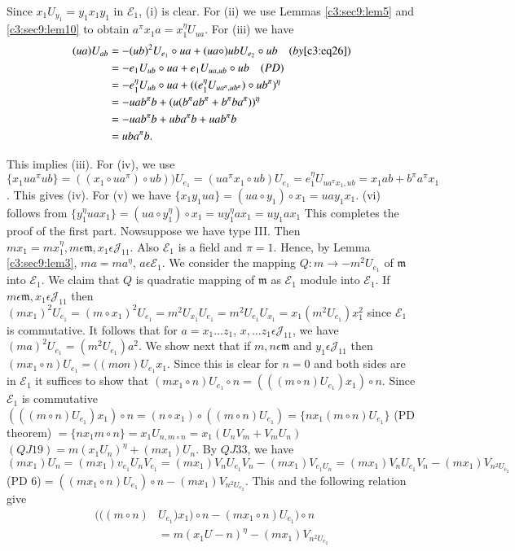 Since $x_1U_{y_1}=y_1x_1y_1$ in $\mathcal{E}_1$, (i) is clear. For
(ii) we use Lemmas \ref{c3:sec9:lem5} and \ref{c3:sec9:lem10} to obtain
$a^{\pi}x_1a=x^{\eta}_1U_{ua}$. For (iii) we have 
\begin{align*}
  (ua)U_{ab}&=-(ub)^{2}U_{e_1}\circ ua +(ua\circ)ubU_{e_2}\circ ub\quad
  (by \eqref{c3:eq26})\\
  &=-e_1U_{ub}\circ ua +e_1U_{ua,ub}\circ ub\quad (PD)\\
  &=-e_1^{\eta}U_{ub}\circ ua+((e^{\eta}_1U_{ua^{\pi},ub^{\pi}})\circ
  ub^{\pi})^{\eta}\\
  &=-uab^{\pi}b+(u(b^{\pi}ab^{\pi}+b^{\pi}ba^{\pi}))^{\eta}\\
  &=-uab^{\pi}b+ub a^{\pi} b+uab^{\pi}b\\
  &=uba^{\pi}b.
\end{align*}

This implies (iii). For (iv), we use $\{x_1ua^{\pi}ub\}=((x_1\circ
ua^{\pi})\circ ub))U_{e_1}=(ua^{\pi}x_1\circ
ub)U_{e_1}=e^{\eta}_1U_{ua^{\pi}x_{1},ub}=x_1 ab+b^{\pi} a^{\pi}
x_1$. This gives (iv). For (v) we have $\{x_1y_1ua\}=(ua \circ
y_1)\circ x_1=u ay_1x_1$. (vi) follows from $\{y^{\eta}_1ua
x_1\}=(ua\circ y^{\eta}_1)\circ x_1=uy^{\eta}_1a x_1=u y_1ax_1$ This
completes the proof of the first part. Now\pageoriginale suppose we
have type III. Then $mx_1=mx_1^{\eta}, m\epsilon \mathfrak{m},
x_1\epsilon \mathscr{J}_{11}$. Also  $\mathcal{E}_1$ is a field and
$\pi=1$. Hence, by Lemma \ref{c3:sec9:lem3}, $ma=ma^{\eta}$, $a\epsilon
\mathcal{E}_1$. We consider the mapping $Q:m\to -m^{2}U_{e_1}$ of
$\mathfrak{m}$ into $\mathcal{E}_1$. We claim that $Q$ is quadratic
mapping of $\mathfrak{m}$ as $\mathcal{E}_1$ module into
$\mathcal{E}_1$. If $m\epsilon \mathfrak{m}, x_1\epsilon
\mathscr{J}_{11}$ then $(mx_1)^{2}U_{e_1}=(m\circ
x_1)^{2}U_{e_1}=m^{2}U_{x_1}U_{e_1}=m^{2}U_{e_1}U_{x_1}=x_1(m^{2}U_{e_1})x^{2}_1$
since $\mathcal{E}_1$ is commutative. It follows that for $a=x_1\ldots
z_1$, $x,\ldots z_1\epsilon \mathscr{J}_{11}$, we have
$(ma)^{2}U_{e_1}=(m^{2}U_{e_1})a^{2}$. We show next that if
$m,n\epsilon\mathfrak{m}$ and $y_1\epsilon \mathscr{J}_{11}$ then
$(mx_1\circ n)U_{e_1}=((mon)U_{e_1}x_1$. Since this is clear for $n=0$
and both sides are in $\mathcal{E}_1$ it suffices to show that $(m
x_1\circ n)U_{e_1}\circ n=(((m\circ n)U_{e_1})x_1)\circ n$. Since
$\mathcal{E}_1$ is commutative $(((m\circ n)U_{e_1})x_1)\circ
n=(n\circ x_1)\circ ((m\circ n)U_{e_1})=\{nx_1(m\circ n)U_{e_1}\}$ (PD
theorem) $=\{nx_1m\circ n\}=x_1U_{n,m\circ n}=x_1(U_nV_m+V_mU_n)$ $(QJ
19)= m(x_1U_n)^{\eta}+(mx_1)U_n$. By $QJ 33$, we have
$(mx_1)U_n=(mx_1)v_{e_1}U_nV_{e_1}=(mx_1)V_n
U_{e_1}V_n-(mx_1)V_{e_1U_n}=(m
x_1)V_nU_{e_1}V_n-(mx_1)V_{n^{2}U_{e_2}}$ (PD $6$)$=((mx_1\circ
n)U_{e_1})\circ n -(mx_1)V_{n^{2}U_{e_2}}$. This and the following
relation give
\begin{align*}
  (((m\circ n)&U_{e_1})x_1)\circ n-(mx_1\circ n)U_{e_1})\circ
  n\tag{34}\label{c3:eq34}\\ 
  &=m(x_1U-n)^{\eta}-(mx_1)V_{n^{2}U_{e_2}}
\end{align*}


